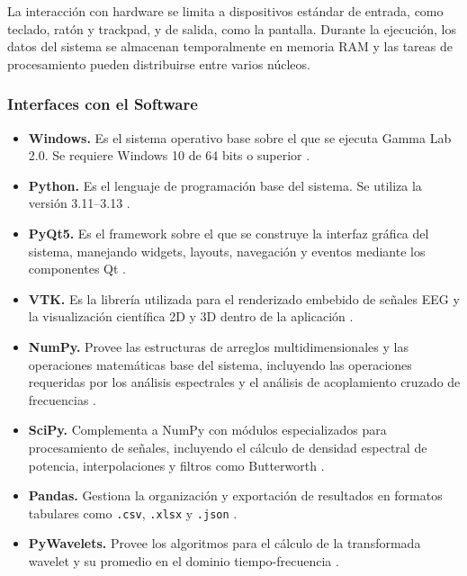 \documentclass[12pt, letterpaper]{article}
\begin{document}
La interacción con hardware se limita a dispositivos estándar de entrada,
como teclado, ratón y trackpad, y de salida, como la pantalla. Durante la
ejecución, los datos del sistema se almacenan temporalmente en memoria RAM y
las tareas de procesamiento pueden distribuirse entre varios núcleos.

\subsubsection{Interfaces con el Software}

\begin{itemize}

    \item \textbf{Windows.} Es el sistema operativo base sobre el que se
    ejecuta Gamma Lab 2.0. Se requiere Windows 10 de 64 bits o superior
    \cite{ref1}.

    \item \textbf{Python.} Es el lenguaje de programación base del sistema.
    Se utiliza la versión 3.11--3.13 \cite{ref2}.

    \item \textbf{PyQt5.} Es el framework sobre el que se construye la
    interfaz gráfica del sistema, manejando widgets, layouts, navegación y
    eventos mediante los componentes Qt \cite{ref3}.

    \item \textbf{VTK.} Es la librería utilizada para el renderizado
    embebido de señales EEG y la visualización científica 2D y 3D dentro de
    la aplicación \cite{ref4}.

    \item \textbf{NumPy.} Provee las estructuras de arreglos
    multidimensionales y las operaciones matemáticas base del sistema,
    incluyendo las operaciones requeridas por los análisis espectrales y el
    análisis de acoplamiento cruzado de frecuencias \cite{ref5}.

    \item \textbf{SciPy.} Complementa a NumPy con módulos especializados para
    procesamiento de señales, incluyendo el cálculo de densidad espectral de
    potencia, interpolaciones y filtros como Butterworth \cite{ref6}.

    \item \textbf{Pandas.} Gestiona la organización y exportación de
    resultados en formatos tabulares como \texttt{.csv}, \texttt{.xlsx} y
    \texttt{.json} \cite{ref7}.

    \item \textbf{PyWavelets.} Provee los algoritmos para el cálculo de la
    transformada wavelet y su promedio en el dominio tiempo-frecuencia \cite{ref8}.


\end{itemize}
\end{document}
